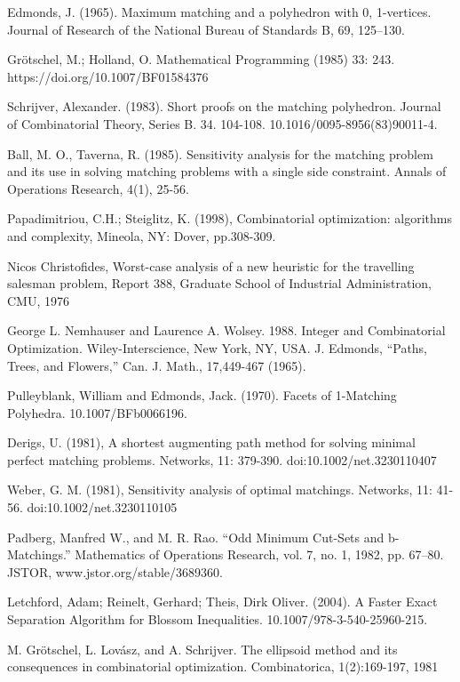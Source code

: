 \documentclass[twoside,a4paper,openright,12pt,tikz]{book}
\begin{document}
\begin{thebibliography}{9}
Edmonds, J. (1965). Maximum matching and a polyhedron with 0, 1-vertices. Journal of Research of the National Bureau of Standards B, 69, 125--130. 

  
Grötschel, M.; Holland, O. Mathematical Programming (1985) 33: 243. https://doi.org/10.1007/BF01584376

Schrijver, Alexander. (1983). Short proofs on the matching polyhedron. Journal of Combinatorial Theory, Series B. 34. 104-108. 10.1016/0095-8956(83)90011-4. 
 
Ball, M. O.,  Taverna, R. (1985). Sensitivity analysis for the matching problem and its use in solving matching problems with a single side constraint. Annals of Operations Research, 4(1), 25-56.

Papadimitriou, C.H.; Steiglitz, K. (1998), Combinatorial optimization: algorithms and complexity, Mineola, NY: Dover, pp.308-309.

Nicos Christofides, Worst-case analysis of a new heuristic for the travelling salesman problem, Report 388, Graduate School of Industrial Administration, CMU, 1976

George L. Nemhauser and Laurence A. Wolsey. 1988. Integer and Combinatorial Optimization. Wiley-Interscience, New York, NY, USA.
J. Edmonds, “Paths, Trees, and Flowers,” Can. J. Math., 17,449-467 (1965).

Pulleyblank, William and Edmonds, Jack. (1970). Facets of 1-Matching Polyhedra. 10.1007/BFb0066196. 

Derigs, U. (1981), A shortest augmenting path method for solving minimal perfect matching problems. Networks, 11: 379-390. doi:10.1002/net.3230110407

Weber, G. M. (1981), Sensitivity analysis of optimal matchings. Networks, 11: 41-56. doi:10.1002/net.3230110105

Padberg, Manfred W., and M. R. Rao. “Odd Minimum Cut-Sets and b-Matchings.” Mathematics of Operations Research, vol. 7, no. 1, 1982, pp. 67–80. JSTOR, www.jstor.org/stable/3689360.

Letchford, Adam;  Reinelt, Gerhard; Theis, Dirk Oliver. (2004). A Faster Exact Separation Algorithm for Blossom Inequalities. 10.1007/978-3-540-25960-215. 

M. Grötschel, L. Lovász, and A. Schrijver. The ellipsoid method and its
consequences in combinatorial optimization. Combinatorica, 1(2):169-197, 1981


\end{thebibliography}
\end{document}

